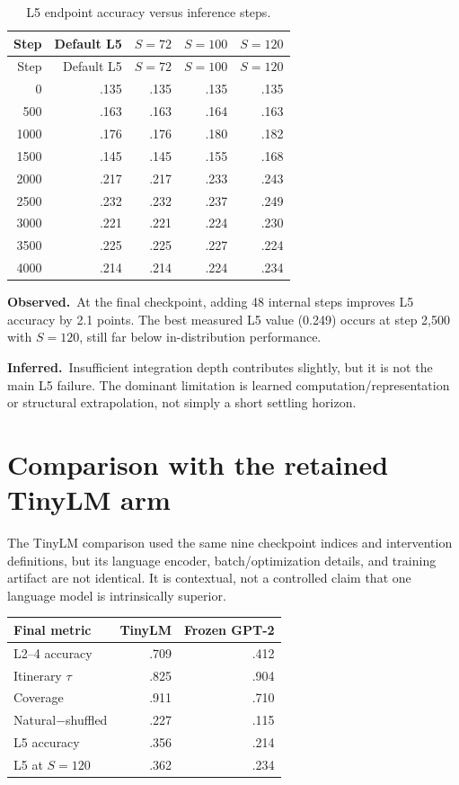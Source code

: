 \documentclass[10pt]{article}
\newcommand{\obs}{\textbf{Observed.}\ }
\newcommand{\inferlabel}{\textbf{Inferred.}\ }
\begin{document}
\begin{longtable}{rrrrr}
\caption{L5 endpoint accuracy versus inference steps.}\\
\toprule
Step & Default L5 & $S=72$ & $S=100$ & $S=120$ \\
\midrule
\endfirsthead
\toprule
Step & Default L5 & $S=72$ & $S=100$ & $S=120$ \\
\midrule
\endhead
0    & .135 & .135 & .135 & .135 \\
500  & .163 & .163 & .164 & .163 \\
1000 & .176 & .176 & .180 & .182 \\
1500 & .145 & .145 & .155 & .168 \\
2000 & .217 & .217 & .233 & .243 \\
2500 & .232 & .232 & .237 & .249 \\
3000 & .221 & .221 & .224 & .230 \\
3500 & .225 & .225 & .227 & .224 \\
4000 & .214 & .214 & .224 & .234 \\
\bottomrule
\end{longtable}

\obs At the final checkpoint, adding 48 internal steps improves L5 accuracy by
2.1 points. The best measured L5 value (0.249) occurs at step 2,500 with
$S=120$, still far below in-distribution performance.

\inferlabel Insufficient integration depth contributes slightly, but it is not the main
L5 failure. The dominant limitation is learned computation/representation or
structural extrapolation, not simply a short settling horizon.

\section{Comparison with the retained TinyLM arm}

The TinyLM comparison used the same nine checkpoint indices and intervention
definitions, but its language encoder, batch/optimization details, and training
artifact are not identical. It is contextual, not a controlled claim that one
language model is intrinsically superior.

\begin{tabular}{lrr}
\toprule
Final metric & TinyLM & Frozen GPT-2 \\
\midrule
L2--4 accuracy & .709 & .412 \\
Itinerary $\tau$ & .825 & .904 \\
Coverage & .911 & .710 \\
Natural$-$shuffled & .227 & .115 \\
L5 accuracy & .356 & .214 \\
L5 at $S=120$ & .362 & .234 \\
\bottomrule
\end{tabular}
\end{document}
